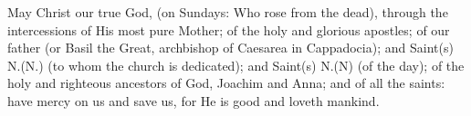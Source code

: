  \pagebreak
\begin{liturgicaltext}
    \priest May Christ our true God, (on Sundays: Who rose from the dead), through the intercessions of His most pure Mother; of the holy and glorious apostles; of our father (or Basil the Great, archbishop of Caesarea in Cappadocia); and Saint(s) N.(N.) (to whom the church is dedicated); and Saint(s) N.(N) (of the day); of the holy and righteous ancestors of God, Joachim and Anna; and of all the saints: have mercy on us and save us, for He is good and loveth mankind.
    \choir {}
\end{liturgicaltext}